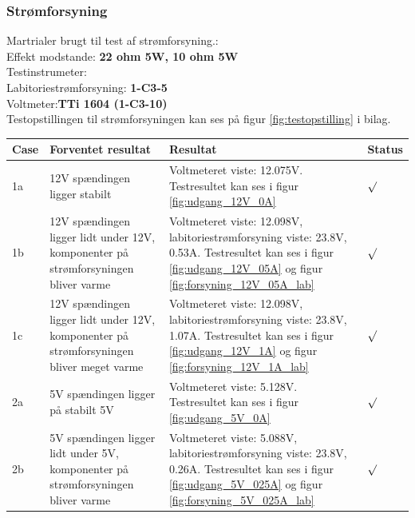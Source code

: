 \subsubsection{Strømforsyning}
Martrialer brugt til test af strømforsyning.:\\
Effekt modstande: \textbf{22 ohm 5W, 10 ohm 5W} \\
Testinstrumeter:\\
Labitoriestrømforsyning: \textbf{1-C3-5} \\
Voltmeter:\textbf{TTi 1604 (1-C3-10)} \\
Testopstillingen til strømforsyningen kan ses på figur \ref{fig:testopstilling} i bilag.\\
\begin{table}[H]
\centering
\begin{tabular}{| p{1cm}  | p{4cm} | p{6cm} | p{1cm} |}
\hline
Case &Forventet resultat &Resultat &Status\\\hline
1a &12V spændingen ligger stabilt &Voltmeteret viste: 12.075V. Testresultet kan ses i figur  \ref{fig:udgang_12V_0A}& \begin{Huge}$\surd$\end{Huge} \\ \hline 
1b &12V spændingen ligger lidt under 12V, komponenter på strømforsyningen bliver varme &Voltmeteret viste: 12.098V, labitoriestrømforsyning viste: 23.8V, 0.53A. Testresultet kan ses i figur  \ref{fig:udgang_12V_05A} og figur \ref{fig:forsyning_12V_05A_lab}& \begin{Huge}$\surd$\end{Huge}\\ \hline
1c &12V spændingen ligger lidt under 12V, komponenter på strømforsyningen bliver meget varme &Voltmeteret viste: 12.098V, labitoriestrømforsyning viste: 23.8V, 1.07A. Testresultet kan ses i figur  \ref{fig:udgang_12V_1A} og figur \ref{fig:forsyning_12V_1A_lab}& \begin{Huge}$\surd$\end{Huge}\\ \hline
2a &5V spændingen ligger på stabilt 5V &Voltmeteret viste: 5.128V. Testresultet kan ses i figur  \ref{fig:udgang_5V_0A} & \begin{Huge}$\surd$\end{Huge} \\ \hline 
2b &5V spændingen ligger lidt under 5V, komponenter på strømforsyningen bliver varme &Voltmeteret viste: 5.088V, labitoriestrømforsyning viste: 23.8V, 0.26A. Testresultet kan ses i figur  \ref{fig:udgang_5V_025A} og figur \ref{fig:forsyning_5V_025A_lab} & \begin{Huge}$\surd$\end{Huge}\\ \hline

\end{tabular}
\end{table}

